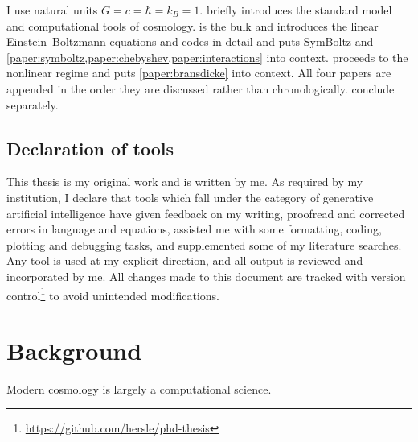 \documentclass[USenglish, thumbmarks]{uiophdthesis} %
\newcommand\EB{Einstein--Boltzmann}
\begin{document}
\begin{preface}

I use natural units $G = c = \hbar = k_B = 1$.
 briefly introduces the standard model and computational tools of cosmology.
 is the bulk and introduces the linear \EB{} equations and codes in detail and puts SymBoltz and \cref{paper:symboltz,paper:chebyshev,paper:interactions} into context.
 proceeds to the nonlinear regime and puts \cref{paper:bransdicke} into context.
All four papers are appended in the order they are discussed rather than chronologically.
 conclude separately.

\section*{Declaration of tools}


This thesis is my original work and is written by me.
As required by my institution,
I declare that tools which fall under the category of generative artificial intelligence
have given feedback on my writing,
proofread and corrected errors in language and equations,
assisted me with some formatting, coding, plotting and debugging tasks,
and supplemented some of my literature searches.
Any tool is used at my explicit direction,
and all output is reviewed and incorporated by me.
All changes made to this document are tracked with version control\footnote{\url{https://github.com/hersle/phd-thesis}}
to avoid unintended modifications.

\end{preface}

\tableofcontents{}
\listoffigures{}
\listoftables{}

\mainmatter{}

\chapter{Background}
\label{chap:back}

Modern cosmology is largely a computational science.

\end{document}
